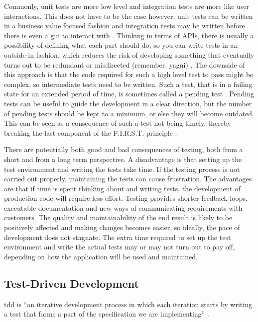 \documentclass[11pt]{article}
\begin{document}
Commonly, unit tests are more low level and integration tests are more like user interactions. This does not have to be the case however, unit tests can be written in a business value focused fashion and integration tests may be written before there is even a \gls{gui} to interact with \cite[question~20]{Ahnve}. Thinking in terms of APIs, there is usually a possibility of defining what each part should do, so you can write tests in an outside-in fashion, which reduces the risk of developing something that eventually turns out to be redundant or misdirected (remember, \gls{yagni}) \cite[question~29]{Ahnve}. The downside of this approach is that the code required for such a high level test to pass might be complex, so intermediate tests need to be written. Such a test, that is in a failing state for an extended period of time, is sometimes called a pending test \cite[question~31]{Ahnve}. Pending tests can be useful to guide the development in a clear direction, but the number of pending tests should be kept to a minimum, or else they will become outdated. This can be seen as a consequence of such a test not being timely, thereby breaking the last component of the F.I.R.S.T. principle \cite[p.~132-133]{Clean}.

There are potentially both good and bad consequences of testing, both from a short and from a long term perspective. A disadvantage is that setting up the test environment and writing the tests take time. If the testing process is not carried out properly, maintaining the tests can cause frustration. The advantages are that if time is spent thinking about and writing tests, the development of production code will require less effort. Testing provides shorter feedback loops, executable documentation and new ways of communicating requirements with customers. The quality and maintainability of the end result is likely to be positively affected and making changes becomes easier, so ideally, the pace of development does not stagnate. The extra time required to set up the test environment and write the actual tests may or may not turn out to pay off, depending on how the application will be used and maintained.

\subsection{Test-Driven Development}
\label{subsec:tdd}

\acrfull{tdd} is ``an iterative development process in which each iteration starts by writing a test that forms a part of the specification we are implementing'' \cite[p.~21]{Tddjs}.
\end{document}

